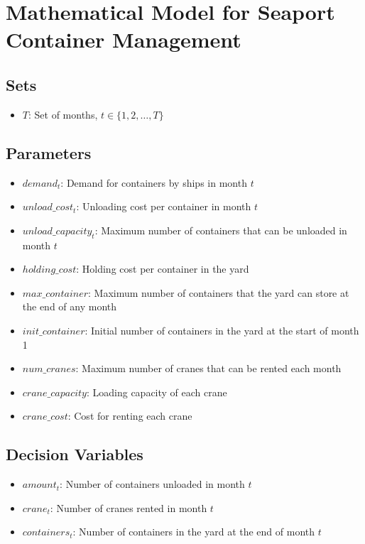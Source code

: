 \documentclass{article}
\begin{document}
\section*{Mathematical Model for Seaport Container Management}

\subsection*{Sets}
\begin{itemize}
    \item $T$: Set of months, $t \in \{1, 2, \ldots, T\}$
\end{itemize}

\subsection*{Parameters}
\begin{itemize}
    \item $demand_{t}$: Demand for containers by ships in month $t$
    \item $unload\_cost_{t}$: Unloading cost per container in month $t$
    \item $unload\_capacity_{t}$: Maximum number of containers that can be unloaded in month $t$
    \item $holding\_cost$: Holding cost per container in the yard
    \item $max\_container$: Maximum number of containers that the yard can store at the end of any month
    \item $init\_container$: Initial number of containers in the yard at the start of month 1
    \item $num\_cranes$: Maximum number of cranes that can be rented each month
    \item $crane\_capacity$: Loading capacity of each crane
    \item $crane\_cost$: Cost for renting each crane
\end{itemize}

\subsection*{Decision Variables}
\begin{itemize}
    \item $amount_{t}$: Number of containers unloaded in month $t$
    \item $crane_{t}$: Number of cranes rented in month $t$
    \item $containers_{t}$: Number of containers in the yard at the end of month $t$
\end{itemize}
\end{document}
